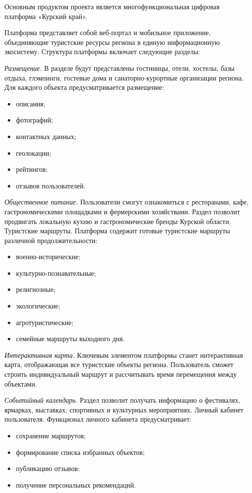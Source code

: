 Основным продуктом проекта является многофункциональная цифровая платформа «Курский край».

Платформа представляет собой веб-портал и мобильное приложение, объединяющие туристские ресурсы региона в единую информационную экосистему.
Структура платформы включает следующие разделы:

\emph{Размещение.} В разделе будут представлены гостиницы, отели, хостелы, базы отдыха, глэмпинги, гостевые дома и санаторно-курортные организации региона.
Для каждого объекта предусматривается размещение:
\begin{itemize}
\item описания;
\item фотографий;
\item контактных данных;
\item геолокации;
\item рейтингов;
\item отзывов пользователей.
\end{itemize}

\emph{Общественное питание.} Пользователи смогут ознакомиться с ресторанами, кафе, гастрономическими площадками и фермерскими хозяйствами. Раздел позволит продвигать локальную кухню и гастрономические бренды Курской области.
Туристские маршруты. Платформа содержит готовые туристские маршруты различной продолжительности:
\begin{itemize}
\item военно-исторические;
\item культурно-познавательные;
\item религиозные;
\item экологические;
\item агротуристические;
\item семейные маршруты выходного дня.
\end{itemize}

\emph{Интерактивная карта.} Ключевым элементом платформы станет интерактивная карта, отображающая все туристские объекты региона. Пользователь сможет строить индивидуальный маршрут и рассчитывать время перемещения между объектами. 

\emph{Событийный календарь.} Раздел позволит получать информацию о фестивалях, ярмарках, выставках, спортивных и культурных мероприятиях.
Личный кабинет пользователя. Функционал личного кабинета предусматривает:
\begin{itemize}
\item сохранение маршрутов;
\item формирование списка избранных объектов;
\item публикацию отзывов;
\item получение персональных рекомендаций.
\end{itemize}

